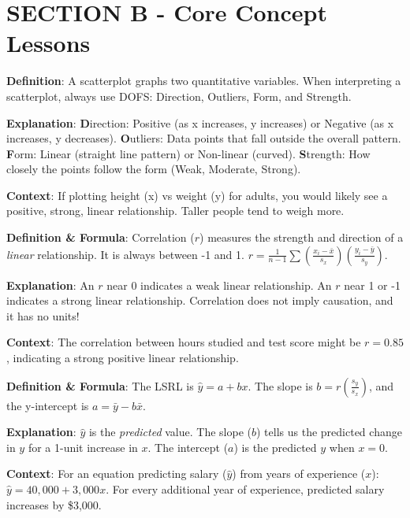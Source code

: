 \section{SECTION B - Core Concept Lessons}

\begin{lessonbox}
\textbf{Definition}: A scatterplot graphs two quantitative variables. When interpreting a scatterplot, always use DOFS: Direction, Outliers, Form, and Strength.

\textbf{Explanation}: 
\textbf{D}irection: Positive (as x increases, y increases) or Negative (as x increases, y decreases).
\textbf{O}utliers: Data points that fall outside the overall pattern.
\textbf{F}orm: Linear (straight line pattern) or Non-linear (curved).
\textbf{S}trength: How closely the points follow the form (Weak, Moderate, Strong).

\textbf{Context}: If plotting height (x) vs weight (y) for adults, you would likely see a positive, strong, linear relationship. Taller people tend to weigh more.
\end{lessonbox}

\begin{lessonbox}
\textbf{Definition \& Formula}: Correlation ($r$) measures the strength and direction of a \textit{linear} relationship. It is always between -1 and 1. $r = \frac{1}{n-1}\sum(\frac{x_i - \bar{x}}{s_x})(\frac{y_i - \bar{y}}{s_y})$.

\textbf{Explanation}: An $r$ near 0 indicates a weak linear relationship. An $r$ near 1 or -1 indicates a strong linear relationship. Correlation does not imply causation, and it has no units!

\textbf{Context}: The correlation between hours studied and test score might be $r = 0.85$, indicating a strong positive linear relationship.
\end{lessonbox}

\begin{lessonbox}
\textbf{Definition \& Formula}: The LSRL is $\hat{y} = a + bx$. The slope is $b = r(\frac{s_y}{s_x})$, and the y-intercept is $a = \bar{y} - b\bar{x}$.

\textbf{Explanation}: $\hat{y}$ is the \textit{predicted} value. The slope ($b$) tells us the predicted change in $y$ for a 1-unit increase in $x$. The intercept ($a$) is the predicted $y$ when $x=0$.

\textbf{Context}: For an equation predicting salary ($\hat{y}$) from years of experience ($x$): $\hat{y} = 40,000 + 3,000x$. For every additional year of experience, predicted salary increases by \$3,000.
\end{lessonbox}

